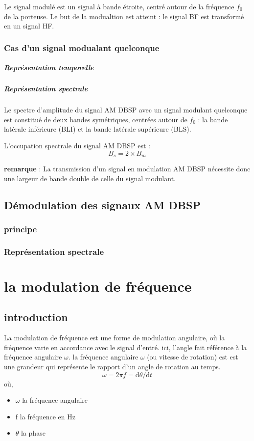 \documentclass[12pt,a4paper,hidelinks,oneside]{book}
\begin{document}
Le signal modulé est un signal à bande étroite, centré autour de la fréquence $f_{0}$ de la porteuse. Le but
de la modualtion est atteint : le signal BF est transformé en un signal HF.

\subsection{Cas d’un signal modualant quelconque}
\paragraph{Représentation temporelle}
\paragraph{Représentation spectrale }
Le spectre d’amplitude du signal AM DBSP avec un signal modulant quelconque est constitué de deux
bandes symétriques, centrées autour de $f_{0}$ : la bande latérale inférieure (BLI) et la bande latérale
supérieure (BLS).

L’occupation spectrale du signal AM DBSP est :
\begin{equation}
B_{s}=2\times B_{m}
\end{equation}

\noindent\textbf{remarque} : La transmission d’un signal en modulation AM DBSP nécessite donc une largeur de bande double de
celle du signal modulant.

\section{Démodulation des signaux AM DBSP}
\subsection{principe}
\subsection{Représentation spectrale}


\chapter{la modulation de fréquence} 
\section{introduction}
La modulation de fréquence est une forme de modulation angulaire, où la fréquence
varie en accordance avec le signal d'entré. ici, l'angle fait référence à la fréquence
angulaire $\omega$. la fréquence angulaire $\omega$ (ou vitesse de rotation) est est une grandeur qui représente
le rapport d'un angle de rotation au temps.
\begin{equation}
\omega=2 \pi f=\mathrm{d} \theta / \mathrm{d} t \label{3.1}
\end{equation}
où,
\begin{itemize}
	\item $\omega$ la fréquence angulaire
	\item f la fréquence en \si{\hertz}
	\item $\theta$ la phase 
\end{itemize}
\end{document}
